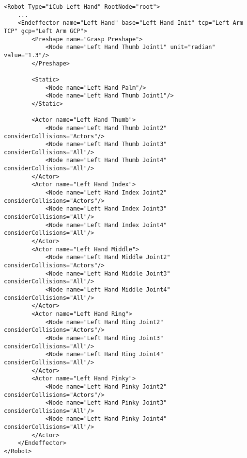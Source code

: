 \begin{lstlisting}
<Robot Type="iCub Left Hand" RootNode="root">
    ...
    <Endeffector name="Left Hand" base="Left Hand Init" tcp="Left Arm TCP" gcp="Left Arm GCP">
        <Preshape name="Grasp Preshape">
            <Node name="Left Hand Thumb Joint1" unit="radian" value="1.3"/>
        </Preshape>

        <Static>
            <Node name="Left Hand Palm"/>
            <Node name="Left Hand Thumb Joint1"/>
        </Static>

        <Actor name="Left Hand Thumb">
            <Node name="Left Hand Thumb Joint2" considerCollisions="Actors"/>
            <Node name="Left Hand Thumb Joint3" considerCollisions="All"/>
            <Node name="Left Hand Thumb Joint4" considerCollisions="All"/>
        </Actor>
        <Actor name="Left Hand Index">
            <Node name="Left Hand Index Joint2" considerCollisions="Actors"/>
            <Node name="Left Hand Index Joint3" considerCollisions="All"/>
            <Node name="Left Hand Index Joint4" considerCollisions="All"/>
        </Actor>
        <Actor name="Left Hand Middle">
            <Node name="Left Hand Middle Joint2" considerCollisions="Actors"/>
            <Node name="Left Hand Middle Joint3" considerCollisions="All"/>
            <Node name="Left Hand Middle Joint4" considerCollisions="All"/>
        </Actor>
        <Actor name="Left Hand Ring">
            <Node name="Left Hand Ring Joint2" considerCollisions="Actors"/>
            <Node name="Left Hand Ring Joint3" considerCollisions="All"/>
            <Node name="Left Hand Ring Joint4" considerCollisions="All"/>
        </Actor>
        <Actor name="Left Hand Pinky">
            <Node name="Left Hand Pinky Joint2" considerCollisions="Actors"/>
            <Node name="Left Hand Pinky Joint3" considerCollisions="All"/>
            <Node name="Left Hand Pinky Joint4" considerCollisions="All"/>
        </Actor>
    </Endeffector>
</Robot>
\end{lstlisting}

\par
